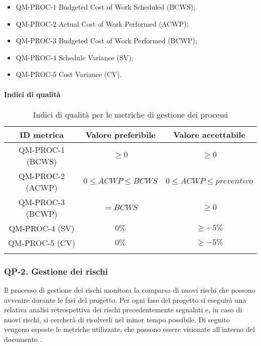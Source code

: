 			\begin{itemize}
				\item QM-PROC-1 Budgeted Cost of Work Scheduled (BCWS);
				\item QM-PROC-2 Actual Cost of Work Performed (ACWP);
				\item QM-PROC-3 Budgeted Cost of Work Performed (BCWP);
				\item QM-PROC-4 Schedule Variance (SV);
				\item QM-PROC-5 Cost Variance (CV).
			\end{itemize}

		\paragraph{Indici di qualità}

			\begin{center}
				\begin{longtable}{|c|c|c|}
				\hline
				\rowcolor{lighter-grayer}
				\textbf{ID metrica} & \textbf{Valore preferibile} & \textbf{Valore accettabile}\\
				\hline
				\endfirsthead
				\hline
				QM-PROC-1 (BCWS) & \(\ge 0\) & \(\ge 0\) \\
				\hline
				QM-PROC-2 (ACWP) & \(0 \le ACWP \le BCWS\) & \(0 \le ACWP \le preventivo\) \\
				\hline
				QM-PROC-3 (BCWP) & \(= BCWS\) & \(\ge 0\) \\
				\hline
				QM-PROC-4 (SV) & \(0\%\) & \(\ge -5\%\) \\
				\hline
				QM-PROC-5 (CV) & \(0\%\) & \(\ge -5\%\) \\
				\hline
				\caption{Indici di qualità per le metriche di gestione dei processi}
				\end{longtable}
			\end{center}

	\subsubsection{QP-2. Gestione dei rischi}

		Il processo di gestione dei rischi monitora la comparsa di nuovi rischi che possono avvenire durante le fasi del progetto.
		Per ogni fase del progetto si eseguirà una relativa analisi retrospettiva dei rischi precedentemente segnalati e, in caso di nuovi rischi, si cercherà di risolverli nel minor tempo possibile.
		Di seguito vengono esposte le metriche utilizzate, che possono essere visionate all'interno del documento .

